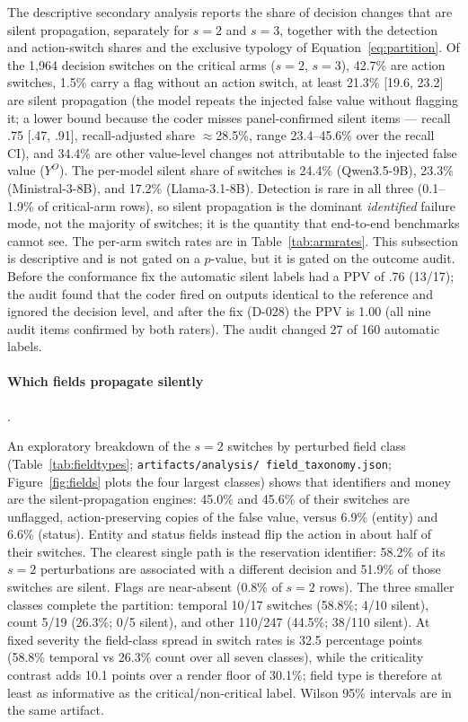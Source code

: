 \documentclass[a4paper,fleqn]{cas-sc}
\begin{document}
The descriptive secondary analysis reports the share of decision changes that are silent
propagation, separately for $s=2$ and $s=3$, together with the detection and action-switch shares
and the exclusive typology of Equation~\ref{eq:partition}. Of the 1{,}964 decision switches on the
critical arms ($s=2$, $s=3$), 42.7\% are action switches, 1.5\% carry a flag without an action
switch, at least 21.3\% [19.6, 23.2] are silent propagation (the model repeats the injected false value without flagging
it; a lower bound because the coder misses panel-confirmed silent items --- recall .75 [.47, .91],
recall-adjusted share $\approx$28.5\%, range 23.4--45.6\% over the recall CI), and 34.4\% are other value-level changes not attributable to the injected false value
($Y^{O}$). The per-model silent share of switches is 24.4\% (Qwen3.5-9B), 23.3\%
(Ministral-3-8B), and 17.2\% (Llama-3.1-8B). Detection is rare in all three (0.1--1.9\% of
critical-arm rows), so silent propagation is the dominant \emph{identified} failure mode, not the
majority of switches; it is the quantity that end-to-end benchmarks cannot see.
The per-arm switch rates are in Table~\ref{tab:armrates}. This subsection is descriptive and is
not gated on a $p$-value, but it is gated on the outcome audit. Before the conformance fix the
automatic silent labels had a PPV of .76 (13/17); the audit found that the coder fired on outputs
identical to the reference and ignored the decision level, and after the fix (D-028) the PPV is
1.00 (all nine audit items confirmed by both raters). The audit changed 27 of 160 automatic
labels.

\paragraph{Which fields propagate silently}.\

An exploratory breakdown of the $s=2$ switches by perturbed field class
(Table~\ref{tab:fieldtypes}; \texttt{artifacts/\allowbreak analysis/\allowbreak
field\_taxonomy.json}; Figure~\ref{fig:fields} plots the four largest classes) shows that identifiers and money are the silent-propagation engines: 45.0\% and 45.6\% of their switches are
unflagged, action-preserving copies of the false value, versus 6.9\% (entity) and 6.6\% (status).
Entity and status fields instead flip the action in about half of their switches. The clearest
single path is the reservation identifier: 58.2\% of its $s=2$ perturbations are associated with a different decision and
51.9\% of those switches are silent. Flags are near-absent (0.8\% of $s=2$ rows). The three
smaller classes complete the partition: temporal 10/17 switches (58.8\%; 4/10 silent),
count 5/19 (26.3\%; 0/5 silent), and other 110/247 (44.5\%; 38/110 silent). At fixed
severity the field-class spread in switch rates is 32.5 percentage points (58.8\% temporal
vs 26.3\% count over all seven classes), while the criticality
contrast adds 10.1 points over a render floor of 30.1\%; field type is therefore at least as
informative as the critical/non-critical label. Wilson 95\% intervals are in the same artifact.
\end{document}
